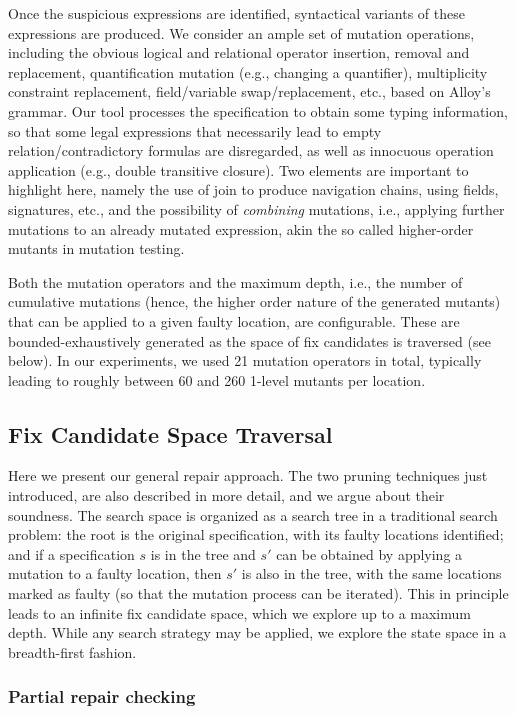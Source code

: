 Once the suspicious expressions are identified, syntactical variants of these expressions are produced. We consider an ample set of mutation operations, including the obvious logical and relational operator insertion, removal and replacement, quantification mutation (e.g., changing a quantifier), multiplicity constraint replacement, field/variable swap/replacement, etc., based on Alloy's grammar. Our tool processes the specification to obtain some typing information, so that some legal expressions that necessarily lead to empty relation/contradictory formulas are disregarded, as well as innocuous operation application (e.g., double transitive closure). Two elements are important to highlight here, namely the use of join to produce navigation chains, using fields, signatures, etc., and the possibility of \emph{combining} mutations, i.e., applying further mutations to an already mutated expression, akin the so called higher-order mutants \cite{DBLP:journals/infsof/JiaH09} in mutation testing.

Both the mutation operators and the maximum depth, i.e., the number of cumulative mutations (hence, the higher order nature of the generated mutants) that can be applied to a given faulty location, are configurable. These are bounded-exhaustively generated as the space of fix candidates is traversed (see below). In our experiments, we used 21 mutation operators in total, typically leading to roughly between 60 and 260 1-level mutants per location.  

\subsection{Fix Candidate Space Traversal}

Here we present our general repair approach. The two pruning techniques just introduced, are also described in more detail, and we argue about their soundness. The search space is organized as a search tree in a traditional search problem: the root is the original specification, with its faulty locations identified; and if a specification $s$ is in the tree and $s'$ can be obtained by applying a mutation to a faulty location, then $s'$ is also in the tree, with the same locations marked as faulty (so that the mutation process can be iterated). This in principle leads to an infinite fix candidate space, which we explore up to a maximum depth. While any search strategy may be applied, we explore the state space in a breadth-first fashion. 

\subsubsection{Partial repair checking}


